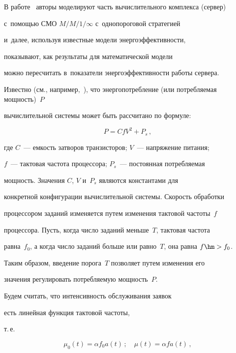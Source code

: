 В работе~\cite{a2} авторы моделируют часть вычислительного комплекса (сервер)

с~по\-мощью СМО $M/M/1/\infty$ с~однопороговой стратегией

и~далее, используя известные модели энергоэффективности,

показывают, как результаты для математической модели

можно пересчитать в~показатели энергоэффективности работы сервера.

Известно (см., например,~\cite{a13}), что энергопотребление (или потребляемая мощность)~$P$ 

вычислительной системы может быть рассчитано по формуле:

\begin{equation}

\label{e1}

P=CfV^2+P_s\,,

\end{equation}

где $C$~--- емкость затворов транзисторов; $V$~--- напряжение питания;

$f$~--- тактовая частота процессора; $P_s$~--- постоянная потребляемая

мощность. Значения $C$, $V$ и~$P_s$ являются константами для

конкретной конфигурации вычислительной системы. Скорость обработки

процессором заданий изменяется путем изменения тактовой частоты~$f$

процессора. Пусть, когда число заданий меньше~$T$, тактовая частота

равна~$f_0$, а когда число заданий больше или равно~$T$, она равна $f\hm>f_0$.

Таким образом, введение порога~$T$ позволяет путем изменения его

значения регулировать потребляемую мощность~$P$.



Будем считать, что интенсивность обслуживания заявок 

есть линейная функция тактовой частоты,

т.\,е.\ 

\begin{equation}

\label{e2}

\mu_0(t)=\alpha f_0 a(t)\,;

\quad

\mu(t)=\alpha f a(t)\,,

\end{equation}

